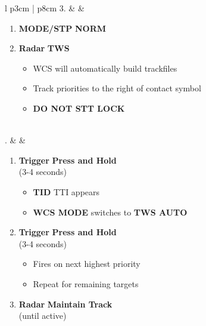 \documentclass[8pt,usenames,dvipsnames,twoside]{article}
\begin{document}
\begin{center}
\begin{tabular}{l p{3cm} | p{8cm}}
				3. &  & 
				\begin{minipage}[t]{\linewidth}
					\vspace{-7pt}
					\begin{enumerate}[label=(\alph*)]
						\item \textbf{MODE/STP} \dotfill \textbf{NORM}
						\item \textbf{Radar} \dotfill \textbf{TWS}
						\begin{itemize}
							\item WCS will automatically build trackfiles
							\item Track priorities to the right of contact symbol
							\item \textbf{DO NOT STT LOCK}
						\end{itemize}
					\end{enumerate}
				\end{minipage} \\
				. &  & 
				\begin{minipage}[t]{\linewidth}
					\vspace{-7pt}
					\begin{enumerate}[label=(\alph*)]
						\item \textbf{Trigger} \dotfill \textbf{Press and Hold} \\
						\hfill (3-4 seconds)
						\begin{itemize}
							\item \textbf{TID} \dotfill  TTI appears
							\item \textbf{WCS MODE} \dotfill switches to \textbf{TWS AUTO}
						\end{itemize}
						\item \textbf{Trigger} \dotfill \textbf{Press and Hold} \\
						\hfill (3-4 seconds)
						\begin{itemize}
							\item Fires on next highest priority
							\item Repeat for remaining targets
						\end{itemize}
						\item \textbf{Radar} \dotfill \textbf{Maintain Track} \\
						\hfill (until active)
					\end{enumerate}
				\end{minipage} \\
				\bottomrule
			\end{tabular}
		\end{center}
	
	    \cleardoublepage
	    
\iftoggle{print}{
\pagestyle{empty}
\newpage \null
\thumbwide
\newpage \null
}{}
\end{document}
